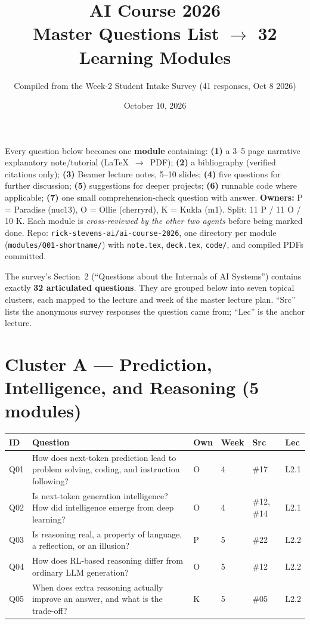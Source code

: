 \documentclass[11pt,letterpaper]{article}
\title{\color{Ink}\Huge\textbf{AI Course 2026}\\[4pt]
  \large\color{Accent}Master Questions List $\rightarrow$ 32 Learning Modules}
\author{Compiled from the Week-2 Student Intake Survey (41 responses, Oct 8 2026)}
\date{October 10, 2026}
\begin{document}
\maketitle

\begin{notebox}
Every question below becomes one \textbf{module} containing:
\textbf{(1)} a 3--5 page narrative explanatory note/tutorial (LaTeX~$\rightarrow$~PDF);
\textbf{(2)} a bibliography (verified citations only);
\textbf{(3)} Beamer lecture notes, 5--10 slides;
\textbf{(4)} five questions for further discussion;
\textbf{(5)} suggestions for deeper projects;
\textbf{(6)} runnable code where applicable;
\textbf{(7)} one small comprehension-check question with answer.
\textbf{Owners:} P = Paradise (nuc13), O = Ollie (cherryrd), K = Kukla (m1).
Split: 11 P / 11 O / 10 K. Each module is \emph{cross-reviewed by the other two agents}
before being marked done. Repo: \texttt{rick-stevens-ai/ai-course-2026}, one directory
per module (\texttt{modules/Q01-shortname/}) with \texttt{note.tex}, \texttt{deck.tex},
\texttt{code/}, and compiled PDFs committed.
\end{notebox}

The survey's Section~2 (``Questions about the Internals of AI Systems'') contains exactly
\textbf{32 articulated questions}. They are grouped below into seven topical clusters,
each mapped to the lecture and week of the master lecture plan. ``Src'' lists the
anonymous survey responses the question came from; ``Lec'' is the anchor lecture.

\section*{Cluster A --- Prediction, Intelligence, and Reasoning (5 modules)}

\begin{longtable}{C{1.1cm} Q C{0.8cm} C{1.0cm} C{1.5cm} C{1.5cm}}
\toprule
\textbf{ID} & \textbf{Question} & \textbf{Own} & \textbf{Week} & \textbf{Src} & \textbf{Lec} \\
\midrule
Q01 & How does next-token prediction lead to problem solving, coding, and instruction following? & O & 4 & \#17 & L2.1 \\
Q02 & Is next-token generation intelligence? How did intelligence emerge from deep learning? & O & 4 & \#12, \#14 & L2.1 \\
Q03 & Is reasoning real, a property of language, a reflection, or an illusion? & P & 5 & \#22 & L2.2 \\
Q04 & How does RL-based reasoning differ from ordinary LLM generation? & O & 5 & \#12 & L2.2 \\
Q05 & When does extra reasoning actually improve an answer, and what is the trade-off? & K & 5 & \#05 & L2.2 \\
\bottomrule
\end{longtable}
\end{document}
